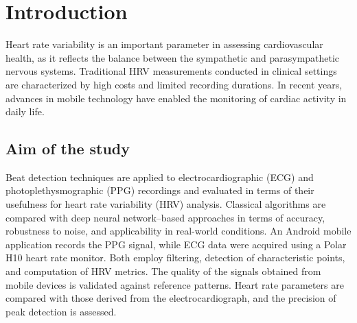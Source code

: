\documentclass[journal]{IEEEtran}
\begin{document}
\section{Introduction}
Heart rate variability is an important parameter in assessing cardiovascular health, as it reflects the balance between the sympathetic and parasympathetic nervous systems. Traditional HRV measurements conducted in clinical settings are characterized by high costs and limited recording durations. In recent years, advances in mobile technology have enabled the monitoring of cardiac activity in daily life.

\subsection{Aim of the study}
Beat detection techniques are applied to electrocardiographic (ECG) and photoplethysmographic (PPG) recordings and evaluated in terms of their usefulness for heart rate variability (HRV) analysis. Classical algorithms are compared with deep neural network–based approaches in terms of accuracy, robustness to noise, and applicability in real-world conditions. An Android mobile application records the PPG signal, while ECG data were acquired using a Polar H10 heart rate monitor. Both employ filtering, detection of characteristic points, and computation of HRV metrics. The quality of the signals obtained from mobile devices is validated against reference patterns. Heart rate parameters are compared with those derived from the electrocardiograph, and the precision of peak detection is assessed.
\end{document}
